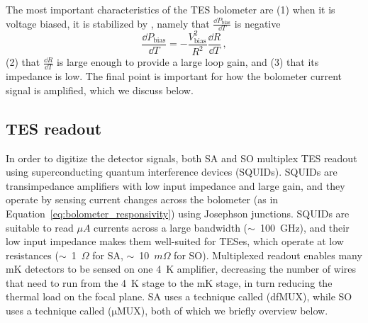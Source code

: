 The most important characteristics of the TES bolometer are (1) when it is voltage biased, it is stabilized by , namely that $\frac{\dd P_{\mathrm{bias}}}{\dd T}$ is negative
\begin{equation}
    \frac{\dd P_{\mathrm{bias}}}{\dd T} = - \frac{V_{\mathrm{bias}}^{2}}{R^{2}} \frac{\dd R}{\dd T} \, ,
    \label{eq:electrothermal_feedback}
\end{equation}
(2) that $\frac{\dd R}{\dd T}$ is large enough to provide a large loop gain, and (3) that its impedance is low. The final point is important for how the bolometer current signal is amplified, which we discuss below.


\subsection{TES readout}
\label{sec:tes_readout}

In order to digitize the detector signals, both SA and SO multiplex TES readout using superconducting quantum interference devices (SQUIDs). SQUIDs are transimpedance amplifiers with low input impedance and large gain, and they operate by sensing current changes across the bolometer (as in Equation~\ref{eq:bolometer_responsivity}) using Josephson junctions. SQUIDs are suitable to read $\mu A$ currents across a large bandwidth ($\sim$~100~GHz), and their low input impedance makes them well-suited for TESes, which operate at low resistances ($\sim$~1~$\Omega$ for SA, $\sim$~10~$m \Omega$ for SO). Multiplexed readout enables many mK detectors to be sensed on one 4~K amplifier, decreasing the number of wires that need to run from the 4~K stage to the mK stage, in turn reducing the thermal load on the focal plane. SA uses a technique called  (dfMUX), while SO uses a technique called  ($\mathrm{\mu}$MUX), both of which we briefly overview below.

